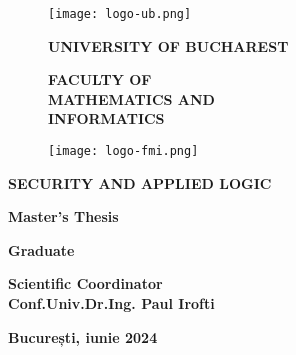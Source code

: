 \begin{titlepage}


\begin{figure}[!htb]
    \centering
    \begin{minipage}{0.2\textwidth}
        \texttt{[image: logo-ub.png]}
    \end{minipage}
    \begin{minipage}{0.5\textwidth}
        \large
        \vspace{0.2cm}
        \begin{center}
            \textbf{UNIVERSITY OF BUCHAREST}
        \end{center}
        \vspace{0.3cm}
        \begin{center}
            \textbf{
                FACULTY OF \\
                MATHEMATICS AND \\
                INFORMATICS}
        \end{center}
    \end{minipage}
    \begin{minipage}{0.2\textwidth}
        \texttt{[image: logo-fmi.png]}
    \end{minipage}
\end{figure}

\begin{center}
\textbf{SECURITY AND APPLIED LOGIC}
\end{center}

\vspace{1cm}

\begin{center}
\Large \textbf{Master’s Thesis}
\end{center}

\begin{center}
\huge \textbf{\MakeUppercase{\@title}}
\end{center}

\vspace{3cm}

\begin{center}
\large \textbf{Graduate \\ \@author}
\end{center}

\vspace{0.25cm}

\begin{center}
\large \textbf{Scientific Coordinator\\ Conf.Univ.Dr.Ing. Paul Irofti}
\end{center}

\vspace{2cm}

\begin{center}
\Large \textbf{București, iunie 2024}
\end{center}
\end{titlepage}
